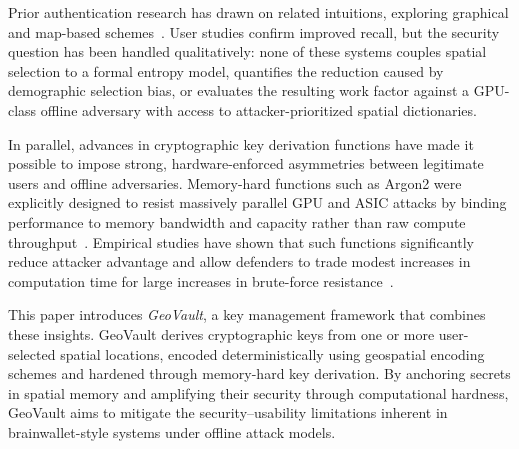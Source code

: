 \documentclass[mathematics,article,accept,pdftex,moreauthors]{Definitions/mdpi}
\begin{document}
{Prior authentication research has drawn on related intuitions, exploring graphical and map-based schemes~\cite{Tari2006,Golla2017,Sun2012,Thorpe2013}. User studies confirm improved recall, but the security question has been handled qualitatively: none of these systems couples spatial selection to a formal entropy model, quantifies the reduction caused by demographic selection bias, or evaluates the resulting work factor against a GPU-class offline adversary with access to attacker-prioritized spatial dictionaries.}

In parallel, advances in cryptographic key derivation functions have made it possible to impose strong, hardware-enforced asymmetries between legitimate users and offline adversaries. Memory-hard functions such as Argon2 were explicitly designed to resist massively parallel GPU and ASIC attacks by binding performance to memory bandwidth and capacity rather than raw compute throughput~\cite{7467361,Wetzels2016}. Empirical studies have shown that such functions significantly reduce attacker advantage and allow defenders to trade modest increases in computation time for large increases in brute-force resistance~\cite{Choe2019}.

This paper introduces \textit{GeoVault}, a key management framework that combines these insights. GeoVault derives cryptographic keys from one or more user-selected spatial locations, encoded deterministically using geospatial encoding schemes and hardened through memory-hard key derivation. By anchoring secrets in spatial memory and amplifying their security through computational hardness, GeoVault aims to mitigate the security--usability limitations inherent in brainwallet-style systems under offline attack models.
\end{document}
